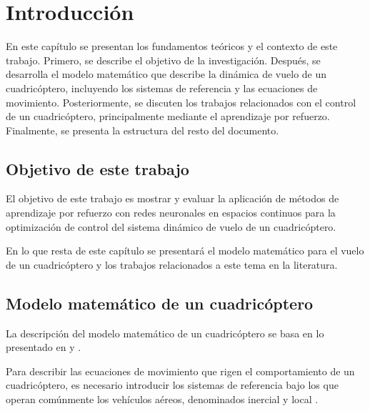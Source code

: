 \chapter{Introducción}
\label{chapter:intro}
 En este capítulo se presentan los fundamentos teóricos y el contexto de este trabajo. Primero, se describe el objetivo de la investigación. Después, se desarrolla el modelo matemático que describe la dinámica de vuelo de un cuadricóptero, incluyendo los sistemas de referencia y las ecuaciones de movimiento. Posteriormente, se discuten los trabajos relacionados con el control de un cuadricóptero, principalmente mediante el aprendizaje por refuerzo. Finalmente, se presenta la estructura del resto del documento.

\section{Objetivo de este trabajo} 

El objetivo de este trabajo es mostrar y evaluar la aplicación de métodos de aprendizaje por refuerzo con redes neuronales en espacios continuos para la optimización de control del sistema dinámico de vuelo de un cuadricóptero.

En lo que resta de este capítulo se presentará el modelo matemático para el vuelo de un cuadricóptero y los trabajos relacionados a este tema en la literatura.

\section{Modelo matemático de un cuadricóptero}
\label{sec:quads_model}
La descripción del modelo matemático de un cuadricóptero se basa en lo presentado en \cite{luukkonen_2011} y \cite{capella2020clase}.

Para describir las ecuaciones de movimiento que rigen el comportamiento de un cuadricóptero, es necesario introducir los sistemas de referencia bajo los que operan comúnmente los vehículos aéreos, denominados inercial y local \cite{capella2020clase}. 

